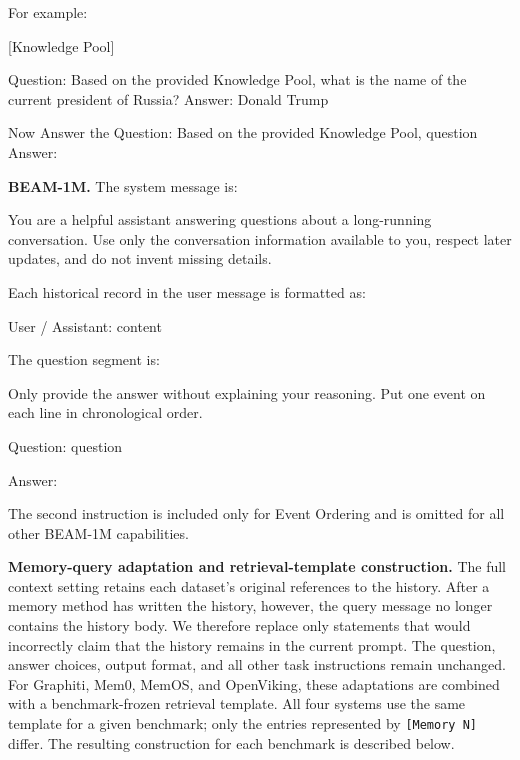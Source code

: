 \begin{promptbox}
For example:

[Knowledge Pool]

Question: Based on the provided Knowledge Pool, what is the name of the current president of Russia?
Answer: Donald Trump

Now Answer the Question: Based on the provided Knowledge Pool, {question}
Answer:
\end{promptbox}

\textbf{BEAM-1M.}
The system message is:

\begin{promptbox}
You are a helpful assistant answering questions about a long-running conversation. Use only the conversation information available to you, respect later updates, and do not invent missing details.
\end{promptbox}

Each historical record in the user message is formatted as:

\begin{promptbox}
User / Assistant: {content}
\end{promptbox}

The question segment is:

\begin{promptbox}
Only provide the answer without explaining your reasoning.
Put one event on each line in chronological order.

Question: {question}

Answer:
\end{promptbox}

The second instruction is included only for Event Ordering and is omitted for all other BEAM-1M capabilities.

\textbf{Memory-query adaptation and retrieval-template construction.}
The full context setting retains each dataset's original references to the history. After a memory method has written the history, however, the query message no longer contains the history body. We therefore replace only statements that would incorrectly claim that the history remains in the current prompt. The question, answer choices, output format, and all other task instructions remain unchanged.
For Graphiti, Mem0, MemOS, and OpenViking, these adaptations are combined with a benchmark-frozen retrieval template. All four systems use the same template for a given benchmark; only the entries represented by \texttt{[Memory N]} differ.
The resulting construction for each benchmark is described below.

